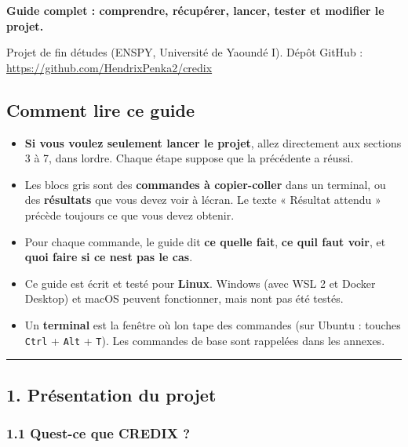 \documentclass[
  french,
  11pt,
  a4paper,
]{article}
\providecommand{\tightlist}{%
  \setlength{\itemsep}{0pt}\setlength{\parskip}{0pt}}
\begin{document}
\textbf{Guide complet : comprendre, récupérer, lancer, tester et
modifier le projet.}

Projet de fin d\textquotesingle études (ENSPY, Université de Yaoundé I).
Dépôt GitHub : \url{https://github.com/HendrixPenka2/credix}

\subsection{Comment lire ce guide}\label{comment-lire-ce-guide}

\begin{itemize}
\tightlist
\item
  \textbf{Si vous voulez seulement lancer le projet}, allez directement
  aux sections 3 à 7, dans l\textquotesingle ordre. Chaque étape suppose
  que la précédente a réussi.
\item
  Les blocs gris sont des \textbf{commandes à copier-coller} dans un
  terminal, ou des \textbf{résultats} que vous devez voir à
  l\textquotesingle écran. Le texte « Résultat attendu » précède
  toujours ce que vous devez obtenir.
\item
  Pour chaque commande, le guide dit \textbf{ce qu\textquotesingle elle
  fait}, \textbf{ce qu\textquotesingle il faut voir}, et \textbf{quoi
  faire si ce n\textquotesingle est pas le cas}.
\item
  Ce guide est écrit et testé pour \textbf{Linux}. Windows (avec WSL 2
  et Docker Desktop) et macOS peuvent fonctionner, mais
  n\textquotesingle ont pas été testés.
\item
  Un \textbf{terminal} est la fenêtre où l\textquotesingle on tape des
  commandes (sur Ubuntu : touches \texttt{Ctrl} + \texttt{Alt} +
  \texttt{T}). Les commandes de base sont rappelées dans les annexes.
\end{itemize}

\begin{center}\rule{0.5\linewidth}{0.5pt}\end{center}

\subsection{1. Présentation du
projet}\label{1-pruxe9sentation-du-projet}

\subsubsection{1.1 Qu\textquotesingle est-ce que CREDIX
?}\label{11-quest-ce-que-credix-}
\end{document}
